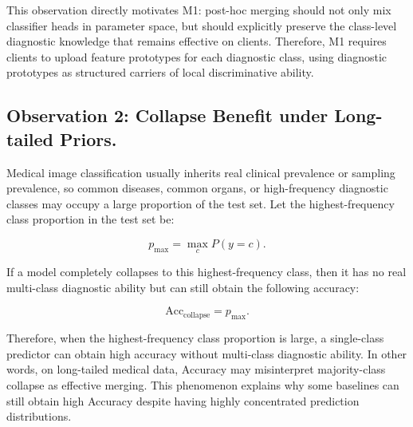 \documentclass[letterpaper]{article}
\begin{document}
This observation directly motivates M1: post-hoc merging should not only mix classifier heads in parameter space, but should explicitly preserve the class-level diagnostic knowledge that remains effective on clients. Therefore, M1 requires clients to upload feature prototypes for each diagnostic class, using diagnostic prototypes as structured carriers of local discriminative ability.


\subsection{Observation 2: Collapse Benefit under Long-tailed Priors.}

Medical image classification usually inherits real clinical prevalence or sampling prevalence, so common diseases, common organs, or high-frequency diagnostic classes may occupy a large proportion of the test set. Let the highest-frequency class proportion in the test set be:


\begin{equation}
p_{\max}=\max_{c} P(y=c).
\end{equation}

If a model completely collapses to this highest-frequency class, then it has no real multi-class diagnostic ability but can still obtain the following accuracy:


\begin{equation}
\mathrm{Acc}_{\mathrm{collapse}}=p_{\max}.
\end{equation}

Therefore, when the highest-frequency class proportion is large, a single-class predictor can obtain high accuracy without multi-class diagnostic ability. In other words, on long-tailed medical data, Accuracy may misinterpret majority-class collapse as effective merging. This phenomenon explains why some baselines can still obtain high Accuracy despite having highly concentrated prediction distributions.
\end{document}
